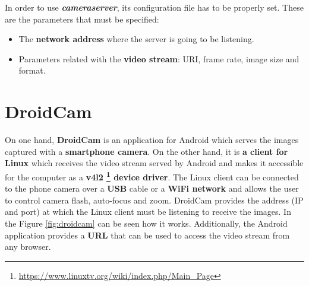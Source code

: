 In order to use \textbf{\textit{cameraserver}}, its configuration file has to be properly set. These are the parameters that must be specified:
\begin{itemize}
	\item The \textbf{network address} where the server is going to be listening.
	
	\item Parameters related with the \textbf{video stream}: URI, frame rate, image size and format.
\end{itemize}

\section{DroidCam}\label{sec:droidcam}
On one hand, \textbf{DroidCam} \cite{droidcam} is an application for Android which serves the images captured with a \textbf{smartphone camera}. On the other hand, it is \textbf{a client for Linux} which receives the video stream served by Android and makes it accessible for the computer as a \textbf{v4l2 \footnote{\url{https://www.linuxtv.org/wiki/index.php/Main_Page}} device driver}. The Linux client can be connected to the phone camera over a \textbf{USB} cable or a \textbf{WiFi network} and allows the user to control camera flash, auto-focus and zoom. DroidCam provides the address (IP and port) at which the Linux client must be listening to receive the images. In the Figure \ref{fig:droidcam} can be seen how it works. Additionally, the Android application provides a \textbf{URL} that can be used to access the video stream from any browser. 

